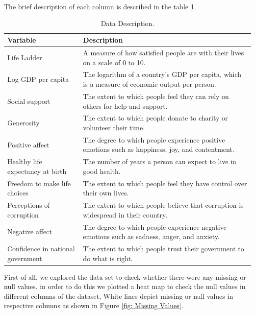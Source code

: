 \documentclass[12pt, a4paper, twoside]{report}
\theoremstyle{plain} %
\theoremstyle{definition} %
\theoremstyle{remark} %
\numberwithin{equation}{chapter}
\begin{document}
The brief description of each column is described in the table \ref{tab: Data Description}. \\

\begin{table}[h!]
\centering
\caption{Data Description.}
\begin{tabular} { 
  | >{\raggedright\arraybackslash}p{4cm} 
    | >{\raggedright\arraybackslash}p{10cm}| }

\hline

\textbf{Variable} & \textbf{Description} \\
\hline 
Life Ladder & A measure of how satisfied people are with their lives on a scale of 0 to 10.\\
\hline
Log GDP per capita & The logarithm of a country's GDP per capita, which is a measure of economic output per person. \\
\hline
Social support & The extent to which people feel they can rely on others for help and support. \\
\hline
Generosity & The extent to which people donate to charity or volunteer their time. \\
\hline
Positive affect & The degree to which people experience positive emotions such as happiness, joy, and contentment.\\
\hline
Healthy life expectancy at birth & The number of years a person can expect to live in good health. \\
\hline
Freedom to make life choices & The extent to which people feel they have control over their own lives. \\
\hline
Perceptions of corruption & The extent to which people believe that corruption is widespread in their country. \\
\hline
Negative affect & The degree to which people experience negative emotions such as sadness, anger, and anxiety. \\
\hline
Confidence in national government & The extent to which people trust their government to do what is right. \\
\hline
\hline
\end{tabular}
\label{tab: Data Description}
\end{table}
\newpage
 
First of all, we explored the data set to check whether there were any missing or null values. in order to do this we plotted a heat map to check the null values in different columns of the dataset, White lines depict missing or null values in respective columns as shown in Figure \ref{fig: Missing Values}.
\end{document}
